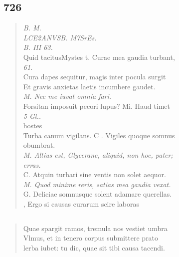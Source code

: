 \documentclass[11pt, a4paper]{report}
\begin{document}
            \subsection*{726}
      \begin{verse}
      \textit{B. M.} \\ \textit{LCE2ANVSB. M7SrEs.} \\ \textit{B. III 63.} \\ Quid tacitusMystes t. Curae mea gaudia turbant, \\ \textit{61.} \\ Cura dapes sequitur, magis inter pocula surgit \\ Et gravis anxietas laetis incumbere gaudet. \\ \textit{M. Nec me iuvat omnia fari.} \\ Forsitan imposuit pecori lupus? Mi. Haud timet \\ \textit{5 Gl..} \\ hostes \\ Turba canum vigilans. C . Vigiles quoque somnus \\ obumbrat. \\ \textit{M. Altius est, Glycerane, aliquid, non hoc, pater;} \\ \textit{erras.} \\ C. Atquin turbari sine ventis non solet aequor. \\ \textit{M. Quod minime reris, satias mea gaudia vexat.} \\ G. Deliciae somnusque solent adamare querellas. \\  \lbrack , Ergo si causas curarum scire laboras \\ 
      \end{verse}
  
            \subsection*{}
      \begin{verse}
      Quae spargit ramos, tremula nos vestiet umbra \\ Vlmus, et in tenero corpus submittere prato \\ lerba iubet: tu dic, quae sit tibi causa tacendi. \\ 
      \end{verse}
  
\end{document}
